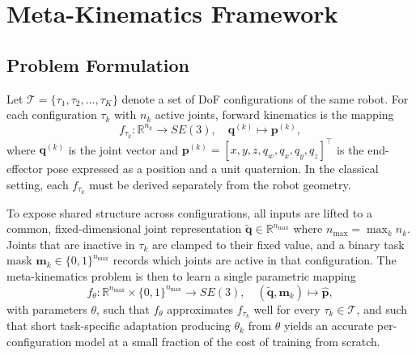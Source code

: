 \documentclass[conference]{IEEEtran}
\begin{document}
\section{Meta-Kinematics Framework}
\label{sec:method}

\subsection{Problem Formulation}
\label{sec:formulation}

Let $\mathcal{T} = \{\tau_1, \tau_2, \dots, \tau_K\}$ denote a set of DoF configurations of the same robot. For each configuration $\tau_k$ with $n_k$ active joints, forward kinematics is the mapping
\begin{equation}
f_{\tau_k}: \mathbb{R}^{n_k} \rightarrow SE(3), \quad \mathbf{q}^{(k)} \mapsto \mathbf{p}^{(k)},
\label{eq:fk}
\end{equation}
where $\mathbf{q}^{(k)}$ is the joint vector and $\mathbf{p}^{(k)} = [x, y, z, q_w, q_x, q_y, q_z]^\top$ is the end-effector pose expressed as a position and a unit quaternion. In the classical setting, each $f_{\tau_k}$ must be derived separately from the robot geometry.

To expose shared structure across configurations, all inputs are lifted to a common, fixed-dimensional joint representation $\tilde{\mathbf{q}} \in \mathbb{R}^{n_{\max}}$ where $n_{\max} = \max_k n_k$. Joints that are inactive in $\tau_k$ are clamped to their fixed value, and a binary task mask $\mathbf{m}_k \in \{0,1\}^{n_{\max}}$ records which joints are active in that configuration. The meta-kinematics problem is then to learn a single parametric mapping
\begin{equation}
f_\theta: \mathbb{R}^{n_{\max}} \times \{0,1\}^{n_{\max}} \rightarrow SE(3), \quad (\tilde{\mathbf{q}}, \mathbf{m}_k) \mapsto \hat{\mathbf{p}},
\label{eq:meta}
\end{equation}
with parameters $\theta$, such that $f_\theta$ approximates $f_{\tau_k}$ well for every $\tau_k \in \mathcal{T}$, and such that short task-specific adaptation producing $\theta_k$ from $\theta$ yields an accurate per-configuration model at a small fraction of the cost of training from scratch.
\end{document}
